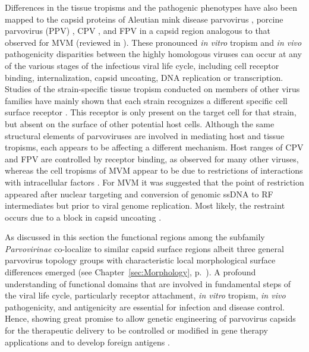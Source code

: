 Differences in the tissue tropisms and the pathogenic phenotypes  have also been mapped to the capsid proteins of Aleutian mink disease parvovirus \cite{pmid8396664}, porcine parvovirus (PPV)  \cite{pmid8642680}, CPV \cite{pmid3176341, pmid1331498}, and FPV \cite{pmid7513918} in a capsid region analogous to that observed for MVM (reviewed in \cite{tropism}). These pronounced \textit{in vitro} tropism and \textit{in vivo} pathogenicity disparities between the highly homologous viruses can occur at any of the various stages of the infectious viral life cycle, including cell receptor binding, internalization, capsid uncoating, DNA replication or transcription. Studies of the strain-specific tissue tropism conducted on members of other virus families have mainly shown that each strain recognizes a different specific cell surface receptor \cite{pmid6290894, pmid13908368, pmid6293181, pmid6278730, pmid7436739, pmid7365250, pmid271999}. This receptor is only present on the target cell for that strain, but absent on the surface of other potential host cells. Although the same structural elements of parvoviruses are involved in mediating host and tissue tropisms, each appears to be affecting a different mechanism. Host ranges of CPV and FPV are controlled by receptor binding, as observed for many other viruses, whereas the cell tropisms of MVM appear to be due to restrictions of interactions with intracellular factors \cite{pmid9817841, pmid12941411, pmid6602221}. For MVM it was suggested that the point of restriction appeared after nuclear targeting and conversion of genomic ssDNA to RF intermediates but prior to viral genome replication. Most likely, the restraint occurs due to a block in capsid uncoating \cite{pmid9311862, pmid1322591}.

As discussed in this section the functional regions among the subfamily \textit{Parvovirinae} co-localize to similar capsid surface regions albeit three general parvovirus topology groups with characteristic local morphological surface differences emerged (see Chapter~\ref{sec:Morphology}, p.~\pageref{sec:Morphology}). A profound understanding of functional domains that are involved in fundamental steps of the viral life cycle, particularly receptor attachment, \textit{in vitro} tropism, \textit{in vivo} pathogenicity, and antigenicity are essential for infection and disease control. Hence, showing great promise to allow genetic engineering of parvovirus capsids for the therapeutic delivery to be controlled or modified in gene therapy applications and to develop foreign antigens \cite{pmid12941411, tropism}.
\label{Chaper6end}     




